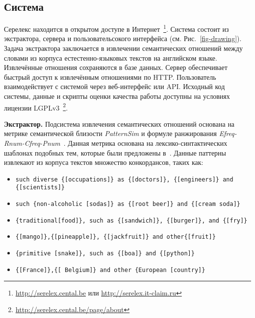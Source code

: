 \documentclass[a4paper,10pt,twoside]{article}
\begin{document}
\subsection{Система}

Серелекс находится в открытом доступе в Интернет~\footnote{\url{http://serelex.cental.be} или \url{http://serelex.it-claim.ru}}.
Система состоит из экстрактора, сервера и пользовательсокого интерфейса (см. Рис.~\ref{fig-drawing}). Задача экстрактора заключается в извлечении семантических отношений между словами из корпуса естестенно-языковых текстов на английском языке. Извлечённые отношения сохраняются в базе данных. Сервер обеспечивает быстрый доступ к извлечённым отношениями по HTTP. Пользователь взаимодействует с системой через веб-интерфейс или API. Исходный код системы, данные и скрипты оценки качества работы доступны на условиях лицензии LGPLv3~\footnote{ \url{http://serelex.cental.be/page/about}}.


\textbf{Экстрактор.} Подсистема извлечения семантических отношений основана на метрике семантической близости \textit{PatternSim} и формуле ранжирования \textit{Efreq-Rnum-Cfreq-Pnum}~\cite{panchenko2012konvens}. Данная  метрика  основана на лексико-синтактических шаблонах подобных тем, которые были предложены в~\cite{hearst1992}. Данные паттерны извлекают из корпуса текстов множество конкордансов, таких как: 

\begin{itemize}
\footnotesize
\item \texttt{such diverse \{[occupations]\} as \{[doctors]\}, \{[engineers]\} and \{[scientists]\}}

\item \texttt{such \{non-alcoholic [sodas]\} as \{[root beer]\} and \{[cream 
 soda]\}}
 
\item \texttt{\{traditional[food]\}, such as \{[sandwich]\}, \{[burger]\}, and \{[fry]\}}

\item \texttt{\{[mango]\},\{[pineapple]\}, \{[jackfruit]\} and other\{[fruit]\}}

\item \texttt{\{primitive [snake]\}, such as \{[boa]\} and \{[python]\}}
\item \texttt{\{[France]\},\{[ Belgium]\} and other \{European [country]\}}
\end{itemize}
\end{document}
